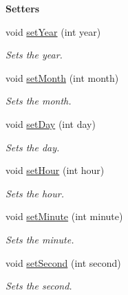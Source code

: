\begin{Indent}{\bf Setters}\par
\begin{DoxyCompactItemize}
\item 
void \hyperlink{class_date_a895c4ae9868e43577cf59d9c679d7a71}{set\+Year} (int year)
\begin{DoxyCompactList}\small\item\em Sets the year. \end{DoxyCompactList}\item 
void \hyperlink{class_date_a23aa56014dd581d691607df5d4474f64}{set\+Month} (int month)
\begin{DoxyCompactList}\small\item\em Sets the month. \end{DoxyCompactList}\item 
void \hyperlink{class_date_a2f97b9d1ac5ef0ef6b6cab3335c5303d}{set\+Day} (int day)
\begin{DoxyCompactList}\small\item\em Sets the day. \end{DoxyCompactList}\item 
void \hyperlink{class_date_a39aed5716d41cecafc37be6a11556112}{set\+Hour} (int hour)
\begin{DoxyCompactList}\small\item\em Sets the hour. \end{DoxyCompactList}\item 
void \hyperlink{class_date_a41af48d9de47a30f77281c453bbec529}{set\+Minute} (int minute)
\begin{DoxyCompactList}\small\item\em Sets the minute. \end{DoxyCompactList}\item 
void \hyperlink{class_date_a3dc2a55fa440645bd9612b8b5bb8ec31}{set\+Second} (int second)
\begin{DoxyCompactList}\small\item\em Sets the second. \end{DoxyCompactList}\end{DoxyCompactItemize}
\end{Indent}
